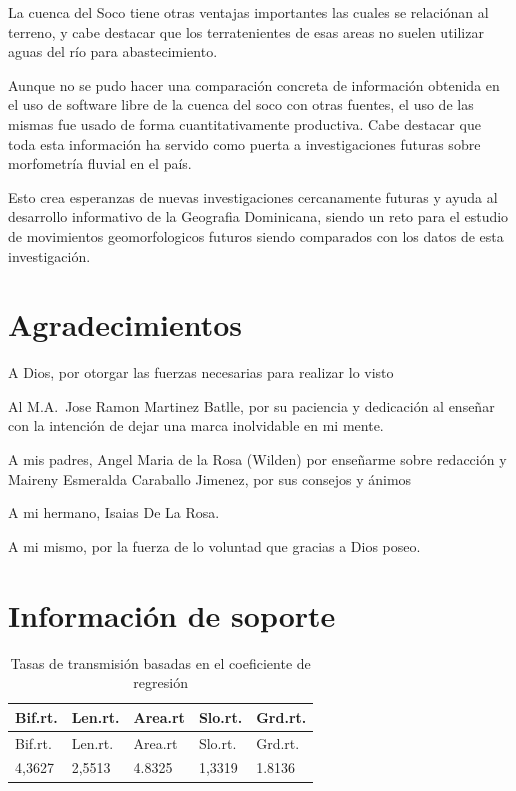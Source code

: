 \documentclass[11pt,]{article}
\begin{document}
La cuenca del Soco tiene otras ventajas importantes las cuales se
relaciónan al terreno, y cabe destacar que los terratenientes de esas
areas no suelen utilizar aguas del río para abastecimiento.

Aunque no se pudo hacer una comparación concreta de información obtenida
en el uso de software libre de la cuenca del soco con otras fuentes, el
uso de las mismas fue usado de forma cuantitativamente productiva. Cabe
destacar que toda esta información ha servido como puerta a
investigaciones futuras sobre morfometría fluvial en el país.

Esto crea esperanzas de nuevas investigaciones cercanamente futuras y
ayuda al desarrollo informativo de la Geografia Dominicana, siendo un
reto para el estudio de movimientos geomorfologicos futuros siendo
comparados con los datos de esta investigación.

\section{Agradecimientos}\label{agradecimientos}

A Dios, por otorgar las fuerzas necesarias para realizar lo visto

Al M.A.~Jose Ramon Martinez Batlle, por su paciencia y dedicación al
enseñar con la intención de dejar una marca inolvidable en mi mente.

A mis padres, Angel Maria de la Rosa (Wilden) por enseñarme sobre
redacción y Maireny Esmeralda Caraballo Jimenez, por sus consejos y
ánimos

A mi hermano, Isaias De La Rosa.

A mi mismo, por la fuerza de lo voluntad que gracias a Dios poseo.

\section{Información de soporte}\label{informaciuxf3n-de-soporte}

\begin{longtable}[]{@{}lllll@{}}
\caption{\label{tablados}Tasas de transmisión basadas en el coeficiente
de regresión}\tabularnewline
\toprule
Bif.rt. & Len.rt. & Area.rt & Slo.rt. & Grd.rt.\tabularnewline
\midrule
\endfirsthead
\toprule
Bif.rt. & Len.rt. & Area.rt & Slo.rt. & Grd.rt.\tabularnewline
\midrule
\endhead
4,3627 & 2,5513 & 4.8325 & 1,3319 & 1.8136\tabularnewline
\bottomrule
\end{longtable}
\end{document}
